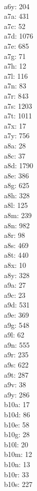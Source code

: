 \begin{multicols}{8}
  \\ a6y: 204
  \\ a7a: 431
  \\ a7c: 52
  \\ a7d: 1076
  \\ a7e: 685
  \\ a7g: 71
  \\ a7h: 12
  \\ a7l: 116
  \\ a7n: 83
  \\ a7r: 843
  \\ a7s: 1203
  \\ a7t: 1011
  \\ a7x: 17
  \\ a7y: 756
  \\ a8a: 28
  \\ a8c: 37
  \\ a8d: 1790
  \\ a8e: 386
  \\ a8g: 625
  \\ a8h: 328
  \\ a8l: 125
  \\ a8m: 239
  \\ a8n: 982
  \\ a8r: 98
  \\ a8s: 469
  \\ a8t: 440
  \\ a8x: 10
  \\ a8y: 328
  \\ a9a: 27
  \\ a9c: 23
  \\ a9d: 531
  \\ a9e: 369
  \\ a9g: 548
  \\ a9l: 62
  \\ a9n: 555
  \\ a9r: 235
  \\ a9s: 622
  \\ a9t: 287
  \\ a9v: 38
  \\ a9y: 286
  \\ b10a: 17
  \\ b10d: 86
  \\ b10e: 58
  \\ b10g: 28
  \\ b10l: 20
  \\ b10m: 12
  \\ b10n: 13
  \\ b10r: 33
  \\ b10s: 227

\end{multicols}
